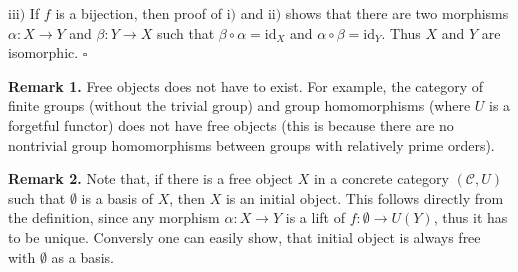 \documentclass[12pt]{article}
\begin{document}
$\mathrm{iii)}$ If $f$ is a bijection, then proof of $\mathrm{i)}$ and $\mathrm{ii)}$ shows that there are two morphisms $\alpha:X\to Y$ and $\beta:Y\to X$ such that $\beta\circ\alpha=\mathrm{id}_{X}$ and $\alpha\circ\beta=\mathrm{id}_{Y}$. Thus $X$ and $Y$ are isomorphic. $\square$


\textbf{Remark 1.} Free objects does not have to exist. For example, the category of finite groups (without the trivial group) and group homomorphisms (where $U$ is a forgetful functor) does not have free objects (this is because there are no nontrivial group homomorphisms between groups with relatively prime orders).

\textbf{Remark 2.} Note that, if there is a free object $X$ in a concrete category $(\mathcal{C},U)$ such that $\emptyset$ is a basis of $X$, then $X$ is an initial object. This follows directly from the definition, since any morphism $\alpha:X\to Y$ is a lift of $f:\emptyset\to U(Y)$, thus it has to be unique. Conversly one can easily show, that initial object is always free with $\emptyset$ as a basis.
\end{document}
